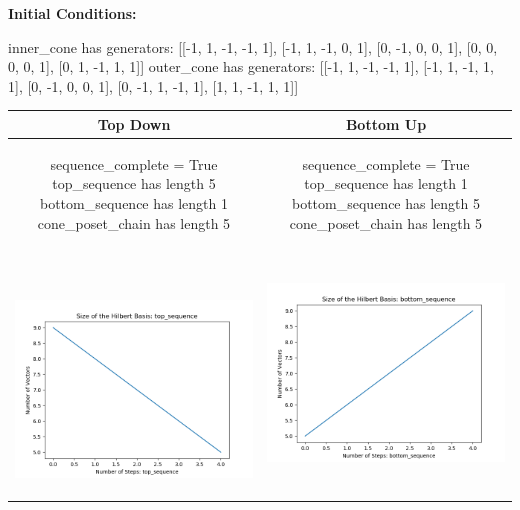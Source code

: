 \documentclass[10pt]{article}
\begin{document}
\textbf{Initial Conditions:}
\begin{SAGE}
inner_cone has generators: 
[[-1, 1, -1, -1, 1], [-1, 1, -1, 0, 1], [0, -1, 0, 0, 1], [0, 0, 0, 0, 1], [0, 1, -1, 1, 1]]
outer_cone has generators: 
[[-1, 1, -1, -1, 1], [-1, 1, -1, 1, 1], [0, -1, 0, 0, 1], [0, -1, 1, -1, 1], [1, 1, -1, 1, 1]]

\end{SAGE}
\begin{tabular}{c|c}
\textbf{Top Down} & \textbf{Bottom Up} \\ \hline  
\begin{SAGE}
	sequence_complete = True
	top_sequence has length 5
	bottom_sequence has length 1
	cone_poset_chain has length 5
\end{SAGE} 
&
\begin{SAGE}
	sequence_complete = True
	top_sequence has length 1
	bottom_sequence has length 5
	cone_poset_chain has length 5
\end{SAGE} 
\\ \hline
\
\begin{minipage}{.45\textwidth}
\includegraphics[width=\textwidth]{"DATA/5d/5 generators 1 bound G/top_sequence SIZE"}
\end{minipage} &
\begin{minipage}{.45\textwidth}
\includegraphics[width=\textwidth]{"DATA/5d/5 generators 1 bound G bottomup/bottom_sequence SIZE"}

\end{minipage}
\end{tabular}
\end{document}
